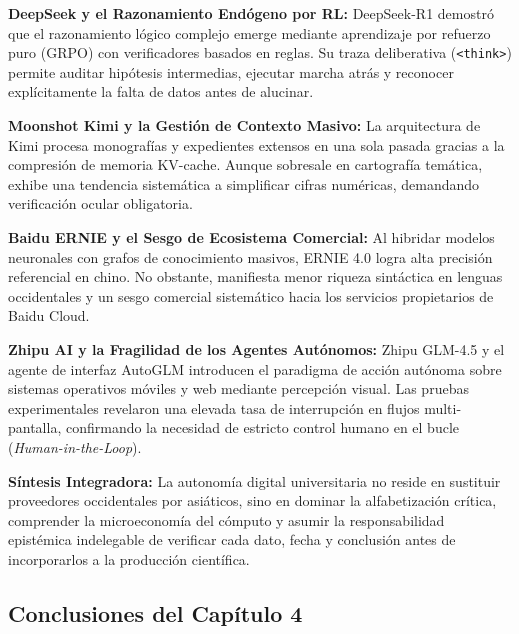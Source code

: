 \begin{resumenlist}[topsep=0.08cm, itemsep=0.08cm, parsep=0pt]
    \item \textbf{DeepSeek y el Razonamiento Endógeno por RL:} DeepSeek-R1 demostró que el razonamiento lógico complejo emerge mediante aprendizaje por refuerzo puro (GRPO) con verificadores basados en reglas. Su traza deliberativa (\texttt{<think>}) permite auditar hipótesis intermedias, ejecutar marcha atrás y reconocer explícitamente la falta de datos antes de alucinar.
    \item \textbf{Moonshot Kimi y la Gestión de Contexto Masivo:} La arquitectura de Kimi procesa monografías y expedientes extensos en una sola pasada gracias a la compresión de memoria KV-cache. Aunque sobresale en cartografía temática, exhibe una tendencia sistemática a simplificar cifras numéricas, demandando verificación ocular obligatoria.
    \item \textbf{Baidu ERNIE y el Sesgo de Ecosistema Comercial:} Al hibridar modelos neuronales con grafos de conocimiento masivos, ERNIE 4.0 logra alta precisión referencial en chino. No obstante, manifiesta menor riqueza sintáctica en lenguas occidentales y un sesgo comercial sistemático hacia los servicios propietarios de Baidu Cloud.
    \item \textbf{Zhipu AI y la Fragilidad de los Agentes Autónomos:} Zhipu GLM-4.5 y el agente de interfaz AutoGLM introducen el paradigma de acción autónoma sobre sistemas operativos móviles y web mediante percepción visual. Las pruebas experimentales revelaron una elevada tasa de interrupción en flujos multi-pantalla, confirmando la necesidad de estricto control humano en el bucle (\textit{Human-in-the-Loop}).
\end{resumenlist}

\begin{cajabeige}
\textbf{Síntesis Integradora:} La autonomía digital universitaria no reside en sustituir proveedores occidentales por asiáticos, sino en dominar la alfabetización crítica, comprender la microeconomía del cómputo y asumir la responsabilidad epistémica indelegable de verificar cada dato, fecha y conclusión antes de incorporarlos a la producción científica.
\end{cajabeige}

\newpage
{}

\subsection*{Conclusiones del Capítulo 4}

